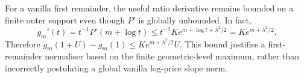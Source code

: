 For a vanilla first remainder, the useful ratio derivative remains bounded
on a finite outer support even though $P'$ is globally unbounded. In fact,
\[
 g_m'(t)=t^{-1}P'(m+\log t)
 \leq t^{-1}Ke^{m+\log t+\lambda^2/2}
 =Ke^{m+\lambda^2/2}.
\]
Therefore $g_m(1+U)-g_m(1)\leq
Ke^{m+\lambda^2/2}U$. This bound justifies a first-remainder normaliser
based on the finite geometric-level maximum, rather than incorrectly
postulating a global vanilla log-price slope norm.
